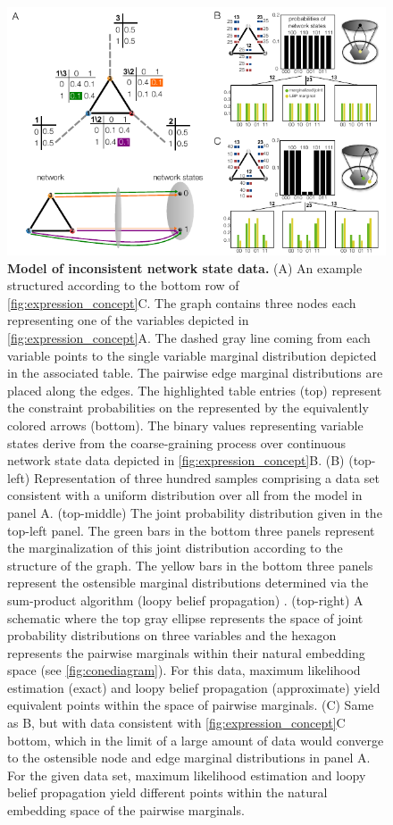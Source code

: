 \begin{figure}[!ht]
\centering
\noindent\includegraphics[width=0.9\columnwidth]{fig/inconsistentthreecycle.pdf}
\caption{{\bf Model of inconsistent network state data.} (A) An example structured according to the bottom row of \ref{fig:expression_concept}C. The graph contains three nodes each representing one of the variables depicted in \ref{fig:expression_concept}A. The dashed gray line coming from each variable points to the single variable marginal distribution depicted in the associated table. The pairwise edge marginal distributions are placed along the edges. The highlighted table entries (top) represent the constraint probabilities on the \gnpm{} represented by the equivalently colored arrows (bottom). The binary values representing variable states derive from the coarse-graining process over continuous network state data depicted in \ref{fig:expression_concept}B. (B) (top-left) Representation of three hundred samples comprising a data set consistent with a uniform distribution over all \gnpm{} from the model in panel A. (top-middle) The joint probability distribution  given in the top-left panel. The green bars in the bottom three panels represent the marginalization of this joint distribution according to the structure of the graph. The yellow bars in the bottom three panels represent the ostensible marginal distributions determined via the sum-product algorithm (loopy belief propagation) \cite{Barber2012}. (top-right) A schematic where the top gray ellipse represents the space of joint probability distributions on three variables and the hexagon represents the pairwise marginals within their natural embedding space (see \ref{fig:conediagram}).  For this data, maximum likelihood estimation (exact) and loopy belief propagation (approximate) yield equivalent points within the space of pairwise marginals. (C) Same as B, but with data consistent with \ref{fig:expression_concept}C bottom, which in the limit of a large amount of data would converge to the ostensible node and edge marginal distributions in panel A. For the given data set, maximum likelihood estimation and loopy belief propagation yield different points within the natural embedding space of the pairwise marginals.}
\label{fig:inconsistentthreecycle}
\end{figure}


